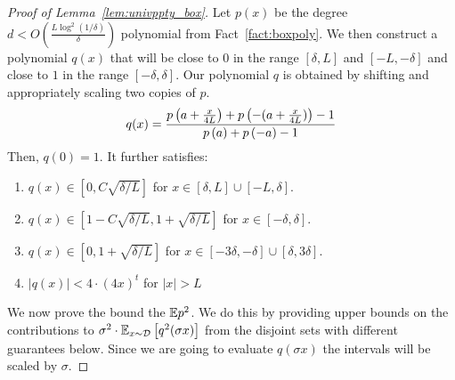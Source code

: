 \begin{proof}[Proof of Lemma~\ref{lem:univppty_box}]
Let $p(x)$ be the degree $d < O\left( \frac{L\log^2(1/\delta)}{\delta}\right)$ polynomial from Fact~\ref{fact:boxpoly}. We then construct a polynomial $q(x)$ that will be close to $0$ in the range $[\delta, L]$ and $[-L, -\delta]$ and close to $1$ in the range $[-\delta, \delta]$. Our polynomial $q$ is obtained by shifting and appropriately scaling two copies of $p$. 
\[
    q(x) = \frac{p\left(a+\frac{x}{4L}\right) + p\left(-(a+\frac{x}{4L})\right) - 1}{p\left(a\right) + p\left(-a\right) - 1}\\
\]
Then, $q(0) = 1$. It further satisfies:
\begin{enumerate}
    \item $q(x) \in [0, C \sqrt{\delta/L}]$ for $x \in [\delta, L]\cup[-L,\delta]$.
    \item $q(x) \in [1-C  \sqrt{\delta/L}, 1+ \sqrt{\delta/L}]$ for $x \in [-\delta, \delta]$.
    \item $q(x) \in [0, 1+ \sqrt{\delta/L}]$ for $x \in [-3\delta, -\delta]\cup[\delta, 3\delta]$.
    \item $|q(x)| < 4 \cdot (4x)^{t}$ for $|x| > L$
\end{enumerate}
We now prove the bound the $\mathbb{E} p^2$. We do this by providing upper bounds on the contributions to $\sigma^2 \cdot \mathbb{E}_{x \sim \mathcal{D}}\left[ q^2(\sigma x) \right]$ from the disjoint sets with different guarantees below. Since we are going to evaluate $q(\sigma x)$ the intervals will be scaled by $\sigma$. 






\end{proof}
